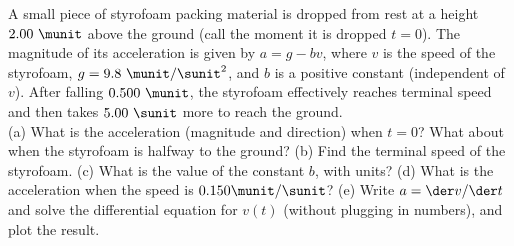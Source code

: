 A small piece of styrofoam packing material is dropped from rest at a
height $2.00\ \munit$ above the ground (call the moment it is dropped $t=0$).
The magnitude of its acceleration is given by $a = g - bv$, where $v$
is the speed of the styrofoam, $g = 9.8\ \munit/\sunit^2$, and $b$
is a positive constant (independent of $v$). After falling $0.500\ \munit$,
the styrofoam effectively reaches terminal speed and then takes 
$5.00\ \sunit$ more to reach the ground.\\
%
(a) What is the acceleration (magnitude and direction) when $t=0$?
What about when the styrofoam is halfway to the ground?\hwendpart
%
(b) Find the terminal speed of the styrofoam. \hwendpart
%
(c) What is the value of the constant $b$, with units?\hwendpart
%
(d) What is the acceleration when the speed is $0.150 \munit/\sunit$?
\hwendpart
%
(e) Write $a = \der v/\der t$ and solve the differential equation for $v(t)$
(without plugging in numbers), and plot the result. 
